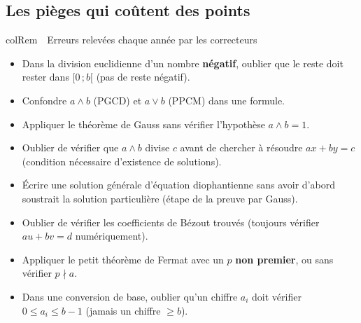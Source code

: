 \documentclass[11pt,a4paper]{article}
\newenvironment{remarque}[1][Remarque]
  {\begin{fiche}{colRem}{\ding{43}~~#1}}{\end{fiche}}
\begin{document}
\subsection{Les pièges qui coûtent des points}

\begin{remarque}[Erreurs relevées chaque année par les correcteurs]
\begin{itemize}[leftmargin=6mm, itemsep=0.5mm]
  \item Dans la division euclidienne d'un nombre \textbf{négatif}, oublier que le reste doit rester dans $[0\,;b[$ (pas de reste négatif).
  \item Confondre $a\wedge b$ (PGCD) et $a\vee b$ (PPCM) dans une formule.
  \item Appliquer le théorème de Gauss sans vérifier l'hypothèse $a\wedge b=1$.
  \item Oublier de vérifier que $a\wedge b$ divise $c$ avant de chercher à résoudre $ax+by=c$ (condition nécessaire d'existence de solutions).
  \item Écrire une solution générale d'équation diophantienne sans avoir d'abord soustrait la solution particulière (étape de la preuve par Gauss).
  \item Oublier de vérifier les coefficients de Bézout trouvés (toujours vérifier $au+bv=d$ numériquement).
  \item Appliquer le petit théorème de Fermat avec un $p$ \textbf{non premier}, ou sans vérifier $p\nmid a$.
  \item Dans une conversion de base, oublier qu'un chiffre $a_i$ doit vérifier $0\leq a_i\leq b-1$ (jamais un chiffre $\geq b$).
\end{itemize}
\end{remarque}
\end{document}
